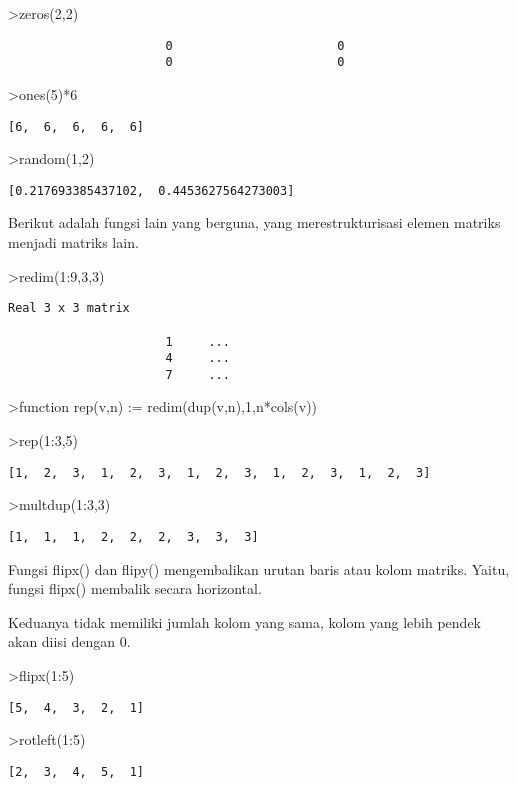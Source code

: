 \documentclass[
]{book}
\begin{document}
\textgreater zeros(2,2)

\begin{verbatim}
                      0                       0 
                      0                       0 
\end{verbatim}

\textgreater ones(5)*6

\begin{verbatim}
[6,  6,  6,  6,  6]
\end{verbatim}

\textgreater random(1,2)

\begin{verbatim}
[0.217693385437102,  0.4453627564273003]
\end{verbatim}

Berikut adalah fungsi lain yang berguna, yang merestrukturisasi elemen matriks menjadi matriks lain.

\textgreater redim(1:9,3,3)

\begin{verbatim}
Real 3 x 3 matrix

                      1     ...
                      4     ...
                      7     ...
\end{verbatim}

\textgreater function rep(v,n) := redim(dup(v,n),1,n*cols(v))

\textgreater rep(1:3,5)

\begin{verbatim}
[1,  2,  3,  1,  2,  3,  1,  2,  3,  1,  2,  3,  1,  2,  3]
\end{verbatim}

\textgreater multdup(1:3,3)

\begin{verbatim}
[1,  1,  1,  2,  2,  2,  3,  3,  3]
\end{verbatim}

Fungsi flipx() dan flipy() mengembalikan urutan baris atau kolom matriks. Yaitu, fungsi flipx() membalik secara horizontal.

Keduanya tidak memiliki jumlah kolom yang sama, kolom yang lebih pendek akan diisi dengan 0.

\textgreater flipx(1:5)

\begin{verbatim}
[5,  4,  3,  2,  1]
\end{verbatim}

\textgreater rotleft(1:5)

\begin{verbatim}
[2,  3,  4,  5,  1]
\end{verbatim}
\end{document}

